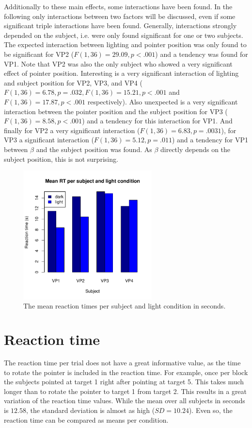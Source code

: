 Additionally to these main effects, some interactions have been found. In the following only interactions between two factors will be discussed, even if some significant triple interactions have been found. Generally, interactions strongly depended on the subject, i.e. were only found significant for one or two subjects. The expected interaction between lighting and pointer position was only found to be significant for VP2 ($F(1,36) = 29.09, p < .001$) and a tendency was found for VP1. Note that VP2 was also the only subject who showed a very significant effect of pointer position. Interesting %
is a very significant interaction of lighting and subject position for VP2, VP3, and VP4 ($F(1,36) = 6.78, p = .032, F(1,36) = 15.21, p<.001$ and $F(1,36) =17.87, p < .001$ respectively). Also unexpected is a very significant interaction between the pointer position and the subject position for VP3 ($F(1,36) = 8.58, p<.001$) and a tendency for this interaction for VP1.
And finally for VP2 a very significant interaction ($F(1,36) = 6.83,p = .0031$), for VP3 a significant interaction ($F(1,36) = 5.12, p = .011$) and a tendency for VP1 between $\beta$ and the subject position was found. As $\beta$ directly depends on the subject position, this is not surprising. 


\begin{figure}
    \centering
    \includegraphics[width=7cm]{Images/plots/ReactionTimes.pdf}
    \caption{The mean reaction times per subject and light condition in seconds.}
    \label{ReactionTime}
\end{figure}

\section{Reaction time}
The reaction time per trial does not have a great informative value, as the time to rotate the pointer is included in the reaction time. For example, once per block the subjects pointed at target 1 right after pointing at target 5. This takes much longer than to rotate the pointer to target 1 from target 2. This results in a great variation of the reaction time values. While the mean over all subjects in seconds is $12.58$, the standard deviation is almost as high ($SD = 10.24$). Even so, the reaction time can be compared as means per condition.

